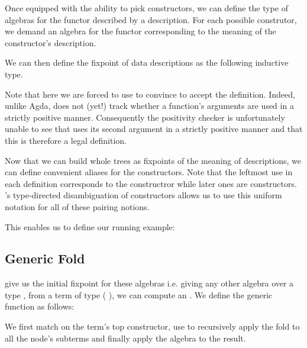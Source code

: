 Once equipped with the ability to pick constructors, we can define
the type of algebras for the functor described by a 
description. For each possible construtor, we demand an algebra for
the functor corresponding to the meaning of the  constructor's description.


We can then define the fixpoint of data descriptions as the following
inductive type.



Note that here we are forced to use \assertTotal{} to convince \idris{}
to accept the definition.
%
Indeed, unlike Agda, \idris{} does not (yet!) track whether a function's
arguments are used in a strictly positive manner.
%
Consequently the positivity checker
is unfortunately unable to see that  uses its second
argument in a strictly positive manner
and that this is therefore a legal definition.

Now that we can build whole trees as fixpoints of the
meaning of descriptions, we can define convenient aliases for
the  constructors.
%
Note that the leftmost \IdrisData{(\#)} use in each definition corresponds
to the  constructror while later ones are 
constructors.
%
\idris{}'s type-directed disambiguation of constructors allows us to use
this uniform notation for all of these pairing notions.


This enables us to define our running example:


\subsection{Generic Fold}\label{sec:genericfoldinductive}

 give us the initial fixpoint for these algebras i.e.
giving any other algebra over a type , from a term of
type ( ), we can compute an .
%
We define the generic  function as follows:


We first match on the term's top constructor, use 
to recursively apply the fold to all the node's subterms and finally
apply the algebra to the result.


